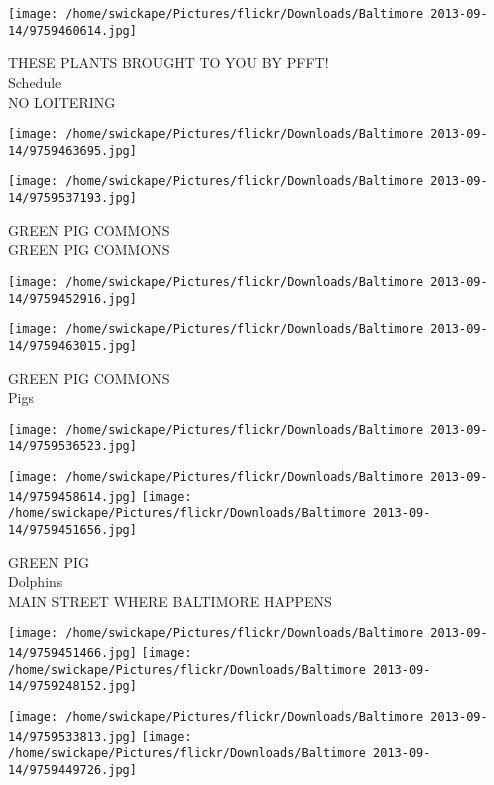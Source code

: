 \documentclass[10pt,letterpaper]{article}
\begin{document}
\vspace{0.25in}
\texttt{[image: /home/swickape/Pictures/flickr/Downloads/Baltimore 2013-09-14/9759460614.jpg]}

THESE PLANTS BROUGHT TO YOU BY PFFT!\\
Schedule\\
NO LOITERING\\
\pagebreak

\texttt{[image: /home/swickape/Pictures/flickr/Downloads/Baltimore 2013-09-14/9759463695.jpg]}

\vspace{0.25in}
\texttt{[image: /home/swickape/Pictures/flickr/Downloads/Baltimore 2013-09-14/9759537193.jpg]}

GREEN PIG COMMONS\\
GREEN PIG COMMONS\\
\pagebreak

\texttt{[image: /home/swickape/Pictures/flickr/Downloads/Baltimore 2013-09-14/9759452916.jpg]}

\vspace{0.25in}
\texttt{[image: /home/swickape/Pictures/flickr/Downloads/Baltimore 2013-09-14/9759463015.jpg]}

GREEN PIG COMMONS\\
Pigs\\
\pagebreak

\texttt{[image: /home/swickape/Pictures/flickr/Downloads/Baltimore 2013-09-14/9759536523.jpg]}

\vspace{0.25in}
\texttt{[image: /home/swickape/Pictures/flickr/Downloads/Baltimore 2013-09-14/9759458614.jpg]}
\texttt{[image: /home/swickape/Pictures/flickr/Downloads/Baltimore 2013-09-14/9759451656.jpg]}

GREEN PIG\\
Dolphins\\
MAIN STREET WHERE BALTIMORE HAPPENS\\
\pagebreak

\texttt{[image: /home/swickape/Pictures/flickr/Downloads/Baltimore 2013-09-14/9759451466.jpg]}
\texttt{[image: /home/swickape/Pictures/flickr/Downloads/Baltimore 2013-09-14/9759248152.jpg]}

\texttt{[image: /home/swickape/Pictures/flickr/Downloads/Baltimore 2013-09-14/9759533813.jpg]}
\texttt{[image: /home/swickape/Pictures/flickr/Downloads/Baltimore 2013-09-14/9759449726.jpg]}
\end{document}
